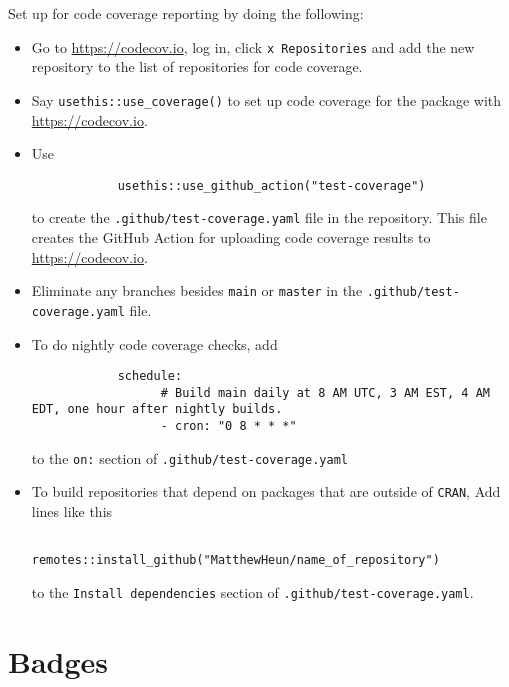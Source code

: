 \documentclass{article}
\begin{document}
Set up for code coverage reporting by doing the following:
%
\begin{itemize}

  \item Go to \url{https://codecov.io}, log in, click \verb|x Repositories| and add
  		the new repository to the list of repositories for code coverage.

  \item Say \verb|usethis::use_coverage()| to set up code coverage
		for the package with \url{https://codecov.io}.

  \item Use
  		\begin{verbatim}
			usethis::use_github_action("test-coverage")
		\end{verbatim}
		to create the \verb|.github/test-coverage.yaml| file in the repository.
		This file creates the GitHub Action for
		uploading code coverage results to \url{https://codecov.io}.

  \item Eliminate any branches besides \texttt{main} or \texttt{master}
  		in the \verb|.github/test-coverage.yaml| file.

  \item To do nightly code coverage checks, add
  		\begin{verbatim}
			schedule:
				  # Build main daily at 8 AM UTC, 3 AM EST, 4 AM EDT, one hour after nightly builds.
				  - cron: "0 8 * * *"
  		\end{verbatim}
		to the \texttt{on:} section of \verb|.github/test-coverage.yaml|

  \item To build repositories that depend on packages that are outside of \texttt{CRAN},
		Add lines like this
	        \begin{verbatim}
				remotes::install_github("MatthewHeun/name_of_repository")
			\end{verbatim}
		to the \texttt{Install dependencies} section of
		\texttt{.github/test-coverage.yaml}.

\end{itemize}


\section{Badges}
\label{sec:badges}
\end{document}
